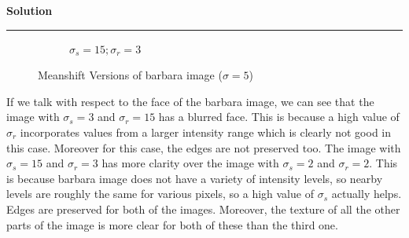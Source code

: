 \documentclass[a4paper]{article}
\newenvironment{solution}[2][]{%
    \begin{mdframed}[linecolor=green!60!black, linewidth=2pt, roundcorner=10pt, backgroundcolor=green!5!white, skipabove=12pt, skipbelow=12pt]%
        \textbf{\large #2} %
        \par\noindent\rule{\textwidth}{0.4pt} %
        \vspace{0.5em} %
}{%
    \end{mdframed}%
}
\begin{document}
\begin{solution}{Solution}
\begin{figure}[H]
\begin{subfigure}[b]{0.24\textwidth}
        \caption{$\sigma_s=15;\sigma_r=3$}
        \label{fig:subfig3}
    \end{subfigure}
    
    \caption{Meanshift Versions of barbara image ($\sigma=5$)}
    \label{fig:overall}
\end{figure}

If we talk with respect to the face of the barbara image, we can see that the image with $\sigma_s=3$ and $\sigma_r=15$ has a blurred face. This is because a high value of $\sigma_r$ incorporates values from a larger intensity range which is clearly not good in this case. Moreover for this case, the edges are not preserved too. The image with $\sigma_s=15$ and $\sigma_r=3$ has more clarity over the image with $\sigma_s=2$ and $\sigma_r=2$. This is because barbara image does not have a variety of intensity levels, so nearby levels are roughly the same for various pixels, so a high value of $\sigma_s$ actually helps. Edges are preserved for both of the images. Moreover, the texture of all the other parts of the image is more clear for both of these than the third one.






\end{solution}
\end{document}
